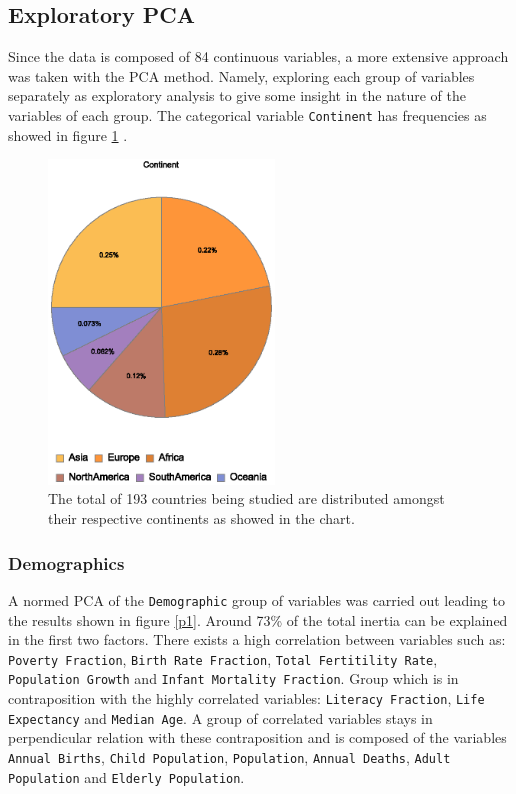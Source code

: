 \documentclass[a4paper,10pt,twocolumn]{article}
\begin{document}
\subsection{Exploratory PCA}
Since the data is composed of 84 continuous variables, a more extensive approach was taken with the PCA method. Namely, exploring each group of variables separately as exploratory analysis to give some insight in the nature of the variables of each group. The categorical variable \texttt{Continent} has frequencies as showed in figure \ref{pie1} . 

\begin{figure}[!ht]
\begin{center}
\includegraphics[width=6cm]{f21.eps}
\caption{\footnotesize{The total of 193 countries being studied are distributed amongst their respective continents as showed in the chart. }\label{pie1}}
\end{center}
\end{figure} 

\subsubsection{Demographics}

A normed PCA of the \texttt{Demographic} group of variables was carried out leading to the results shown in figure \ref{p1}. Around 73\% of the total inertia can be explained in the first two factors. There exists a high correlation between variables such as: \texttt{Poverty Fraction}, \texttt{Birth Rate Fraction}, \texttt{Total Fertitility Rate}, \texttt{Population Growth} and \texttt{Infant Mortality Fraction}. Group which is in contraposition with the highly correlated variables: \texttt{Literacy Fraction}, \texttt{Life Expectancy} and \texttt{Median Age}. A group of correlated variables stays in perpendicular relation with these contraposition and is composed of the variables \texttt{Annual Births}, \texttt{Child Population}, \texttt{Population}, \texttt{Annual Deaths}, \texttt{Adult Population} and \texttt{Elderly Population}. %
\end{document}
